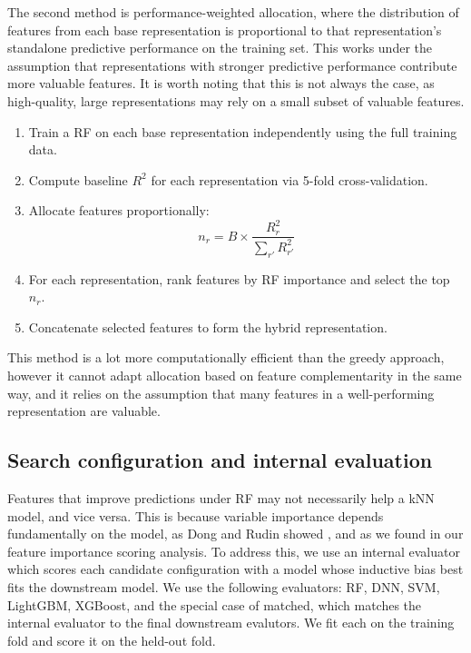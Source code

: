 {%

The second method is performance-weighted allocation, where the distribution of features from each base representation is proportional to that representation's standalone predictive performance on the training set. This works under the assumption that representations with stronger predictive performance contribute more valuable features. It is worth noting that this is not always the case, as high-quality, large representations may rely on a small subset of valuable features. 

\begin{enumerate}
    \item Train a RF on each base representation independently using the full training data.
    \item Compute baseline $R^2$ for each representation via 5-fold cross-validation.
    \item Allocate features proportionally: 
    \[
    n_r = B \times \frac{R^2_r}{\sum_{r'} R^2_{r'}}
    \]
    \item For each representation, rank features by RF importance and select the top $n_r$.
    \item Concatenate selected features to form the hybrid representation.
\end{enumerate}

This method is a lot more computationally efficient than the greedy approach, however it cannot adapt allocation based on feature complementarity in the same way, and it relies on the assumption that many features in a well-performing representation are valuable. 


\subsection{Search configuration and internal evaluation}

Features that improve predictions under RF may not necessarily help a kNN model, and vice versa. This is because variable importance depends fundamentally on the model, as Dong and Rudin showed \citep{Dong2020}, and as we found in our feature importance scoring analysis. To address this, we use an internal evaluator which scores each candidate configuration with a model whose inductive bias best fits the downstream model. We use the following evaluators: RF, DNN, SVM, LightGBM, XGBoost, and the special case of matched, which matches the internal evaluator to the final downstream evalutors. We fit each on the training fold and score it on the held-out fold. 

}
